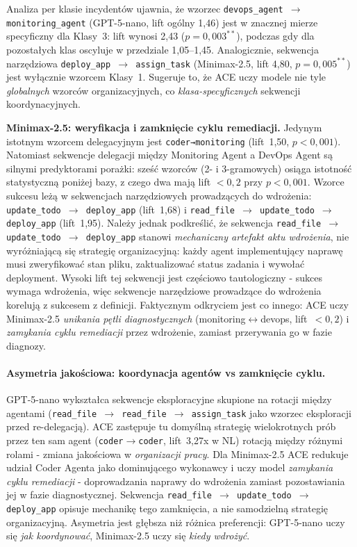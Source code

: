 Analiza per klasie incydentów ujawnia, że wzorzec \texttt{devops\_agent $\to$ monitoring\_agent} (GPT-5-nano, lift ogólny 1,46) jest w znacznej mierze specyficzny dla Klasy~3: lift wynosi 2,43 ($p=0{,}003^{**}$), podczas gdy dla pozostałych klas oscyluje w przedziale 1,05--1,45. Analogicznie, sekwencja narzędziowa \texttt{deploy\_app $\to$ assign\_task} (Minimax-2.5, lift 4,80, $p=0{,}005^{**}$) jest wyłącznie wzorcem Klasy~1. Sugeruje to, że ACE uczy modele nie tyle \emph{globalnych} wzorców organizacyjnych, co \emph{klasa-specyficznych} sekwencji koordynacyjnych.

\textbf{Minimax-2.5: weryfikacja i zamknięcie cyklu remediacji.} Jedynym istotnym wzorcem delegacyjnym jest \texttt{coder→monitoring} (lift~1,50, $p < 0{,}001$). Natomiast sekwencje delegacji między Monitoring Agent a DevOps Agent są silnymi predyktorami porażki: sześć wzorców (2- i 3-gramowych) osiąga istotność statystyczną poniżej bazy, z czego dwa mają lift $< 0{,}2$ przy $p < 0{,}001$. Wzorce sukcesu leżą w sekwencjach narzędziowych prowadzących do wdrożenia: \texttt{update\_todo $\to$ deploy\_app} (lift~1,68) i \texttt{read\_file $\to$ update\_todo $\to$ deploy\_app} (lift~1,95). Należy jednak podkreślić, że sekwencja \texttt{read\_file $\to$ update\_todo $\to$ deploy\_app} stanowi \emph{mechaniczny artefakt aktu wdrożenia}, nie wyróżniającą się strategię organizacyjną: każdy agent implementujący naprawę musi zweryfikować stan pliku, zaktualizować status zadania i wywołać deployment. Wysoki lift tej sekwencji jest częściowo tautologiczny - sukces wymaga wdrożenia, więc sekwencje narzędziowe prowadzące do wdrożenia korelują z sukcesem z definicji. Faktycznym odkryciem jest co innego: ACE uczy Minimax-2.5 \emph{unikania pętli diagnostycznych} (monitoring$\leftrightarrow$devops, lift~$<0{,}2$) i \emph{zamykania cyklu remediacji} przez wdrożenie, zamiast przerywania go w fazie diagnozy.

\paragraph{Asymetria jakościowa: koordynacja agentów vs zamknięcie cyklu.}
GPT-5-nano wykształca sekwencje eksploracyjne skupione na rotacji między agentami (\texttt{read\_file $\to$ read\_file $\to$ assign\_task} jako wzorzec eksploracji przed re-delegacją). ACE zastępuje tu domyślną strategię wielokrotnych prób przez ten sam agent (\texttt{coder$\to$coder}, lift~3,27x w NL) rotacją między różnymi rolami - zmiana jakościowa w \emph{organizacji pracy}. Dla Minimax-2.5 ACE redukuje udział Coder Agenta jako dominującego wykonawcy i uczy model \emph{zamykania cyklu remediacji} - doprowadzania naprawy do wdrożenia zamiast pozostawiania jej w fazie diagnostycznej. Sekwencja \texttt{read\_file $\to$ update\_todo $\to$ deploy\_app} opisuje mechanikę tego zamknięcia, a nie samodzielną strategię organizacyjną. Asymetria jest głębsza niż różnica preferencji: GPT-5-nano uczy się \emph{jak koordynować}, Minimax-2.5 uczy się \emph{kiedy wdrożyć}.

